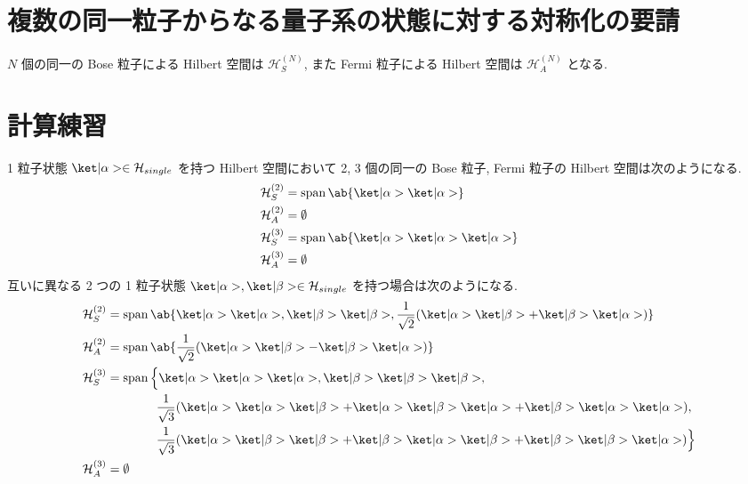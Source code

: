 \documentclass[uplatex,dvipdfmx,a4paper,11pt]{jlreq}
\DeclareMathOperator{\Span}{span}
\newcommand{\HH}{\mathcal{H}}
\numberwithin{equation}{section}
\theoremstyle{definition}
\begin{document}
\section{複数の同一粒子からなる量子系の状態に対する対称化の要請}
\begin{definition}
  $N$ 個の同一の Bose 粒子による Hilbert 空間は $\HH_S^{(N)}$, また Fermi 粒子による Hilbert 空間は $\HH_A^{(N)}$ となる.
\end{definition}

\section{計算練習}
\begin{example}[Q21-25, Q21-26, Q21-27]
  1 粒子状態 $\ket|\alpha>\in\HH_{single}$ を持つ Hilbert 空間において 2, 3 個の同一の Bose 粒子, Fermi 粒子の Hilbert 空間は次のようになる.
  \begin{align}
    \HH_S^{(2)} & = \Span\ab\{\ket|\alpha>\ket|\alpha>\}             \\
    \HH_A^{(2)} & = \emptyset                                        \\
    \HH_S^{(3)} & = \Span\ab\{\ket|\alpha>\ket|\alpha>\ket|\alpha>\} \\
    \HH_A^{(3)} & = \emptyset
  \end{align}
  互いに異なる 2 つの 1 粒子状態 $\ket|\alpha>, \ket|\beta>\in\HH_{single}$ を持つ場合は次のようになる.
  \begin{align}
    \HH_S^{(2)} & = \Span\ab\{\ket|\alpha>\ket|\alpha>, \ket|\beta>\ket|\beta>, \frac{1}{\sqrt{2}}(\ket|\alpha>\ket|\beta> + \ket|\beta>\ket|\alpha>)\}               \\
    \HH_A^{(2)} & = \Span\ab\{\frac{1}{\sqrt{2}}(\ket|\alpha>\ket|\beta> - \ket|\beta>\ket|\alpha>)\}                                                                 \\
    \HH_S^{(3)} & = \Span\Big\{\ket|\alpha>\ket|\alpha>\ket|\alpha>, \ket|\beta>\ket|\beta>\ket|\beta>,                                                               \\
                & \qquad\qquad \frac{1}{\sqrt{3}}(\ket|\alpha>\ket|\alpha>\ket|\beta> + \ket|\alpha>\ket|\beta>\ket|\alpha> + \ket|\beta>\ket|\alpha>\ket|\alpha>),   \\
                & \qquad\qquad \frac{1}{\sqrt{3}}(\ket|\alpha>\ket|\beta>\ket|\beta> + \ket|\beta>\ket|\alpha>\ket|\beta> + \ket|\beta>\ket|\beta>\ket|\alpha>)\Big\} \\
    \HH_A^{(3)} & = \emptyset

\end{align}
\end{example}
\end{document}
